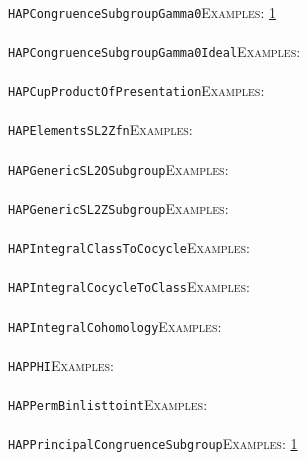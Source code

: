 \documentclass[a4paper,11pt]{report}
\begin{document}
{{ \\
 \texttt{HAP{\textunderscore}CongruenceSubgroupGamma0}{\nobreakspace}{\nobreakspace}{\nobreakspace}{\nobreakspace}\textsc{Examples:} \href{tutorial/chap10.html} {1}{\nobreakspace} \\
 \\
 \texttt{HAP{\textunderscore}CongruenceSubgroupGamma0Ideal}{\nobreakspace}{\nobreakspace}{\nobreakspace}{\nobreakspace}\textsc{Examples:} \\
 \\
 \texttt{HAP{\textunderscore}CupProductOfPresentation}{\nobreakspace}{\nobreakspace}{\nobreakspace}{\nobreakspace}\textsc{Examples:} \\
 \\
 \texttt{HAP{\textunderscore}ElementsSL2Zfn}{\nobreakspace}{\nobreakspace}{\nobreakspace}{\nobreakspace}\textsc{Examples:} \\
 \\
 \texttt{HAP{\textunderscore}GenericSL2OSubgroup}{\nobreakspace}{\nobreakspace}{\nobreakspace}{\nobreakspace}\textsc{Examples:} \\
 \\
 \texttt{HAP{\textunderscore}GenericSL2ZSubgroup}{\nobreakspace}{\nobreakspace}{\nobreakspace}{\nobreakspace}\textsc{Examples:} \\
 \\
 \texttt{HAP{\textunderscore}IntegralClassToCocycle}{\nobreakspace}{\nobreakspace}{\nobreakspace}{\nobreakspace}\textsc{Examples:} \\
 \\
 \texttt{HAP{\textunderscore}IntegralCocycleToClass}{\nobreakspace}{\nobreakspace}{\nobreakspace}{\nobreakspace}\textsc{Examples:} \\
 \\
 \texttt{HAP{\textunderscore}IntegralCohomology}{\nobreakspace}{\nobreakspace}{\nobreakspace}{\nobreakspace}\textsc{Examples:} \\
 \\
 \texttt{HAP{\textunderscore}PHI}{\nobreakspace}{\nobreakspace}{\nobreakspace}{\nobreakspace}\textsc{Examples:} \\
 \\
 \texttt{HAP{\textunderscore}PermBinlisttoint}{\nobreakspace}{\nobreakspace}{\nobreakspace}{\nobreakspace}\textsc{Examples:} \\
 \\
 \texttt{HAP{\textunderscore}PrincipalCongruenceSubgroup}{\nobreakspace}{\nobreakspace}{\nobreakspace}{\nobreakspace}\textsc{Examples:} \href{tutorial/chap10.html} {1}{\nobreakspace} \\
}}
\end{document}
